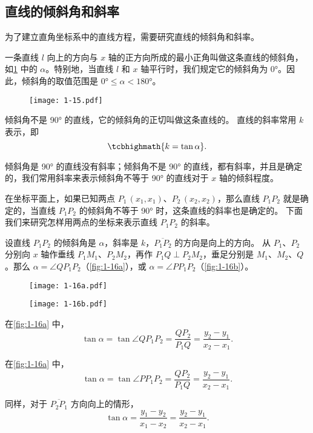 \subsection{直线的倾斜角和斜率}
为了建立直角坐标系中的直线方程，需要研究直线的倾斜角和斜率。

一条直线 $l$ 向上的方向与 $x$ 轴的正方向所成的最小正角叫做这条直线的倾斜角，如\cref{fig:1-15} 中的 $\alpha$。特别地，当直线 $l$ 和 $x$ 轴平行时，我们规定它的倾斜角为 \ang{0}。因此，倾斜角的取值范围是 $\ang{0}\leqslant\alpha<\ang{180}$。
\begin{figure}
  \texttt{[image: 1-15.pdf]}
  \caption{}\label{fig:1-15}
\end{figure}

倾斜角不是 \ang{90} 的直线，它的倾斜角的正切叫做这条直线的。
直线的斜率常用 $k$ 表示，即
\[ \tcbhighmath{k = \tan\alpha}. \]

倾斜角是 \ang{90} 的直线没有斜率；倾斜角不是 \ang{90} 的直线，都有斜率，并且是确定的，我们常用斜率来表示倾斜角不等于 \ang{90} 的直线对于 $x$ 轴的倾斜程度。

在坐标平面上，如果已知两点 $P_1\,(x_1,x_1)$、$P_2\,(x_2,x_2)$，那么直线 $P_1P_2$ 就是确定的，当直线 $P_1P_2$ 的倾斜角不等于 \ang{90} 时，这条直线的斜率也是确定的。
下面我们来研究怎样用两点的坐标来表示直线 $P_1P_2$ 的斜率。

设直线 $P_1P_2$ 的倾斜角是 $\alpha$，斜率是 $k$，$\overline{P_1P_2}$ 的方向是向上的方向。
从 $P_1$、$P_2$ 分别向 $x$ 轴作垂线 $P_1M_1$、$P_2M_2$，再作 $P_1Q \perp P_2M_2$，垂足分别是 $M_1$、$M_2$、$Q$。那么 $\alpha = \angle QP_1P_2$（\cref{fig:1-16a}），或 $\alpha = \angle PP_1P_2$（\cref{fig:1-16b}）。
\begin{figure}
  \begin{minipage}[b]{0.48\linewidth}\centering
    \texttt{[image: 1-16a.pdf]}
    \subcaption{}\label{fig:1-16a}
  \end{minipage}
  \begin{minipage}[b]{0.48\linewidth}\centering
    \texttt{[image: 1-16b.pdf]}
    \subcaption{}\label{fig:1-16b}
  \end{minipage}
  \caption{}\label{fig:1-16}
\end{figure}

在\cref{fig:1-16a} 中，
\[ \tan\alpha =\tan\angle QP_1P_2 =\frac{QP_2}{P_1Q}=\frac{y_2-y_1}{x_2-x_1}.\]

在\cref{fig:1-16a} 中，
\[ \tan\alpha =\tan\angle PP_1P_2 =\frac{QP_2}{P_1Q}=\frac{y_2-y_1}{x_2-x_1}.\]

同样，对于 $\overline{P_2P_1}$ 方向向上的情形，
\[ \tan\alpha= \frac{y_1-y_2}{x_1-x_2}=\frac{y_2-y_1}{x_2-x_1}. \]

